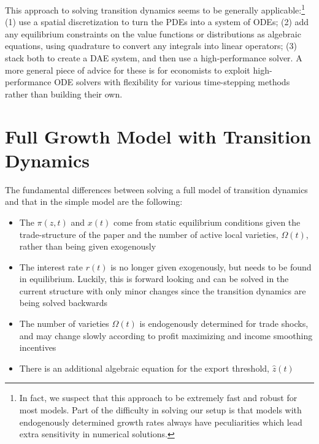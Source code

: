 \documentclass[11pt]{article}
\begin{document}
This approach to solving transition dynamics seems to be generally applicable:\footnote{In fact, we suspect that this approach to be extremely fast and robust for most models.  Part of the difficulty in solving our setup is that models with endogenously determined growth rates always have peculiarities which lead extra sensitivity in numerical solutions.} (1) use a spatial discretization to turn the PDEs into a system of ODEs; (2) add any equilibrium constraints on the value functions or distributions as algebraic equations, using quadrature to convert any integrals into linear operators; (3) stack both to create a DAE system, and then use a high-performance solver.  A more general piece of advice for these is for economists to exploit high-performance ODE solvers with flexibility for various time-stepping methods rather than building their own.

\section{Full Growth Model with Transition Dynamics}
The fundamental differences between solving a full model of transition dynamics and that in the simple model are the following:
\begin{itemize}
	\item The $\pi(z,t)$ and $x(t)$ come from static equilibrium conditions given the trade-structure of the paper and the number of active local varieties, $\Omega(t)$, rather than being given exogenously
	\item The interest rate $r(t)$ is no longer given exogenously, but needs to be found in equilibrium.  Luckily, this is forward looking and can be solved in the current structure with only minor changes since the transition dynamics are being solved backwards
	\item The number of varieties $\Omega(t)$ is endogenously determined for trade shocks, and may change slowly according to profit maximizing and income smoothing incentives
	\item There is an additional algebraic equation for the export threshold, $\hat{z}(t)$
\end{itemize}
\end{document}
